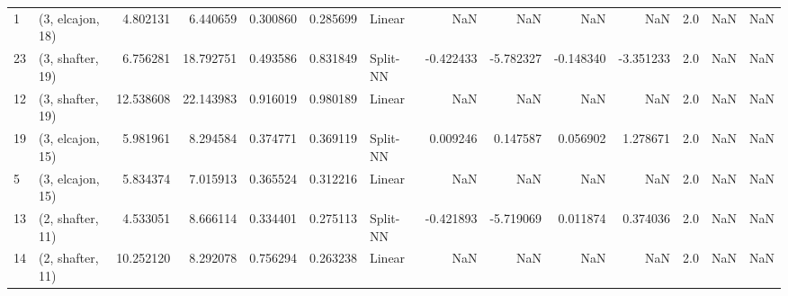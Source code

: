\begin{tabular}{llrrrrlrrrrrrl}
1  &  (3, elcajon, 18) &   4.802131 &   6.440659 &   0.300860 &  0.285699 &      Linear &             NaN &           NaN &            NaN &          NaN &            2.0 &    NaN &              NaN \\
23 &  (3, shafter, 19) &   6.756281 &  18.792751 &   0.493586 &  0.831849 &    Split-NN &       -0.422433 &     -5.782327 &      -0.148340 &    -3.351233 &            2.0 &    NaN &              NaN \\
12 &  (3, shafter, 19) &  12.538608 &  22.143983 &   0.916019 &  0.980189 &      Linear &             NaN &           NaN &            NaN &          NaN &            2.0 &    NaN &              NaN \\
19 &  (3, elcajon, 15) &   5.981961 &   8.294584 &   0.374771 &  0.369119 &    Split-NN &        0.009246 &      0.147587 &       0.056902 &     1.278671 &            2.0 &    NaN &              NaN \\
5  &  (3, elcajon, 15) &   5.834374 &   7.015913 &   0.365524 &  0.312216 &      Linear &             NaN &           NaN &            NaN &          NaN &            2.0 &    NaN &              NaN \\
13 &  (2, shafter, 11) &   4.533051 &   8.666114 &   0.334401 &  0.275113 &    Split-NN &       -0.421893 &     -5.719069 &       0.011874 &     0.374036 &            2.0 &    NaN &              NaN \\
14 &  (2, shafter, 11) &  10.252120 &   8.292078 &   0.756294 &  0.263238 &      Linear &             NaN &           NaN &            NaN &          NaN &            2.0 &    NaN &              NaN \\
\bottomrule
\end{tabular}
